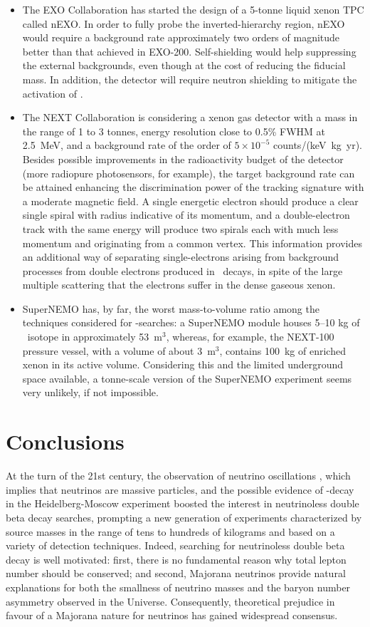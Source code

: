 \documentclass{PoS}
\begin{document}
\begin{itemize}
%
\item The EXO Collaboration has started the design of a 5-tonne liquid xenon TPC called nEXO. In order to fully probe the inverted-hierarchy region, nEXO would require a background rate approximately two orders of magnitude better than that achieved in EXO-200. Self-shielding would help suppressing the external backgrounds, even though at the cost of reducing the fiducial mass. In addition, the detector will require neutron shielding to mitigate the activation of \XE.
%
\item The NEXT Collaboration is considering a xenon gas detector with a mass in the range of 1 to 3 tonnes, energy resolution close to 0.5\% FWHM at 2.5~MeV, and a background rate of the order of $5\times10^{-5}$ counts/(keV~kg~yr). Besides possible improvements in the radioactivity budget of the detector (more radiopure photosensors, for example), the target background rate can be attained enhancing the discrimination power of the tracking signature with a moderate magnetic field. A single energetic electron should produce a clear single spiral with radius indicative of its momentum, and a double-electron track with the same energy will produce two spirals each with much less momentum and originating from a common vertex. This information provides an additional way of separating single-electrons arising from background processes from double electrons produced in \bbonu\ decays, in spite of the large multiple scattering that the electrons suffer in the dense gaseous xenon.
%
\item SuperNEMO has, by far, the worst mass-to-volume ratio among the techniques considered for \bbonu-searches: a SuperNEMO module houses 5--10 kg of \bb\ isotope in approximately 53~m$^{3}$, whereas, for example, the NEXT-100 pressure vessel, with a volume of about 3~m$^{3}$, contains 100~kg of enriched xenon in its active volume. Considering this and the limited underground space available, a tonne-scale version of the SuperNEMO experiment seems very unlikely, if not impossible.
\end{itemize}


\section{Conclusions} \label{Conclusions}
At the turn of the 21st century, the observation of neutrino oscillations \cite{Fukuda:1998mi}, which implies that neutrinos are massive particles, and the possible evidence of \bbonu-decay in the Heidelberg-Moscow experiment \cite{KlapdorKleingrothaus:2001ke} boosted the interest in neutrinoless double beta decay searches, prompting a new generation of experiments characterized by source masses in the range of tens to hundreds of kilograms and based on a variety of detection techniques. Indeed, searching for neutrinoless double beta decay is well motivated: first, there is no fundamental reason why total lepton number should be conserved; and second, Majorana neutrinos provide natural explanations for both the smallness of neutrino masses and the baryon number asymmetry observed in the Universe. Consequently, theoretical prejudice in favour of a Majorana nature for neutrinos has gained widespread consensus.
\end{document}
